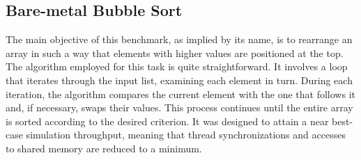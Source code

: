 \begin{table}[!htb]
    \caption{System Configurations}
    \begin{minipage}{.5\linewidth}
      \centering
        \label{tab:hostSystemConfig}
    \end{minipage}%
    \begin{minipage}{.5\linewidth}
        \centering
        \label{tab:targetSystemConfig}
    \end{minipage} 
\end{table}

\subsection{Bare-metal Bubble Sort}

The main objective of this benchmark, as implied by its name, is to rearrange an array in such a way that elements with higher values are positioned at the top. The algorithm employed for this task is quite straightforward. It involves a loop that iterates through the input list, examining each element in turn. During each iteration, the algorithm compares the current element with the one that follows it and, if necessary, swaps their values. This process continues until the entire array is sorted according to the desired criterion. It was designed to attain a near best-case simulation throughput, meaning that thread synchronizations and accesses to shared memory are reduced to a minimum.

